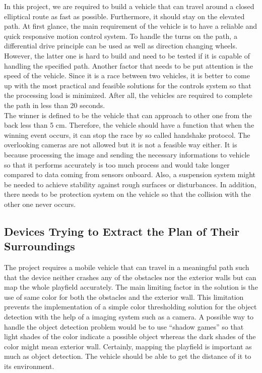 \documentclass[a4paper,12pt]{article}
\begin{document}
In this project, we are required to build a vehicle that can travel around a closed elliptical route as fast as possible. Furthermore, it should stay on the elevated path. At first glance, the main requirement of the vehicle is to have a reliable and quick responsive motion control system. To handle the turns on the path, a differential drive principle can be used as well as direction changing wheels. However, the latter one is hard to build and need to be tested if it is capable of handling the specified path. Another factor that needs to be put attention is the speed of the vehicle. Since it is a race between two vehicles, it is better to come up with the most practical and feasible solutions for the controls system so that the processing load is minimized. After all, the vehicles are required to complete the path in less than 20 seconds.\\

The winner is defined to be the vehicle that can approach to other one from the back less than 5 cm. Therefore, the vehicle should have a function that when the winning event occurs, it can stop the race by so called handshake protocol. The overlooking cameras are not allowed but it is not a feasible way either. It is because processing the image and sending the necessary informations to vehicle so that it performs accurately is too much process and would take longer compared to data coming from sensors onboard. Also, a suspension system might be needed to achieve stability against rough surfaces or disturbances. In addition, there needs to be protection system on the vehicle so that the collision with the other one never occurs.


\subsection{Devices Trying to Extract the Plan of Their Surroundings}
The project requires a mobile vehicle that can travel in a meaningful path such that the device neither crashes any of the obstacles nor the exterior walls but can map the whole playfield accurately. The main limiting factor in the solution is the use of same color for both the obstacles and the exterior wall. This limitation prevents the implementation of a simple color thresholding solution for the object detection with the help of a imaging system such as a camera. A possible way to handle the object detection problem would be to use “shadow games” so that light shades of the color indicate a possible object whereas the dark shades of the color might mean exterior wall. Certainly, mapping the playfield is important as much as object detection. The vehicle should be able to get the distance of it to its environment. \\
\end{document}
